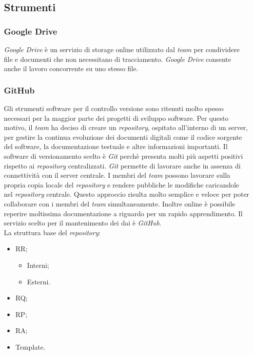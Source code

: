 \subsection{Strumenti}

\subsubsection{Google Drive}
\textit{Google Drive} è un servizio di storage online utilizzato dal
\textit{team} per condividere file e documenti che non necessitano di tracciamento.
\textit{Google Drive} consente anche il lavoro concorrente su uno stesso
file.
\subsubsection{GitHub}
Gli strumenti software per il controllo versione sono ritenuti molto spesso necessari per la maggior parte dei progetti di sviluppo software.
Per questo motivo, il \textit{team} ha deciso di creare un \textit{repository}, ospitato all'interno di un server, per gestire la continua evoluzione dei documenti digitali come il codice sorgente del software, la documentazione testuale e altre informazioni importanti.
Il software di versionamento scelto è \textit{Git} perchè presenta molti più aspetti positivi rispetto ai \textit{repository} centralizzati. \textit{Git} permette di lavorare anche in assenza di connettività con il server centrale. I membri del \textit{team} possono lavorare sulla propria copia locale del \textit{repository} e rendere pubbliche le modifiche caricandole nel \textit{repository} centrale. Questo approccio risulta molto semplice e veloce per poter collaborare con i membri del \textit{team} simultaneamente.
Inoltre online è possibile reperire moltissima documentazione a riguardo per un rapido apprendimento. Il servizio scelto per il mantenimento dei dai è \textit{GitHub}. \\La struttura base del \textit{repository}:
\begin{itemize}
  \item
	RR;
	\begin{itemize}
		\item
			Interni;
		\item
			Esterni.
	\end{itemize}
  \item
    RQ;
  \item
    RP;
  \item
  	RA;
  \item
  	Template.
\end{itemize}

